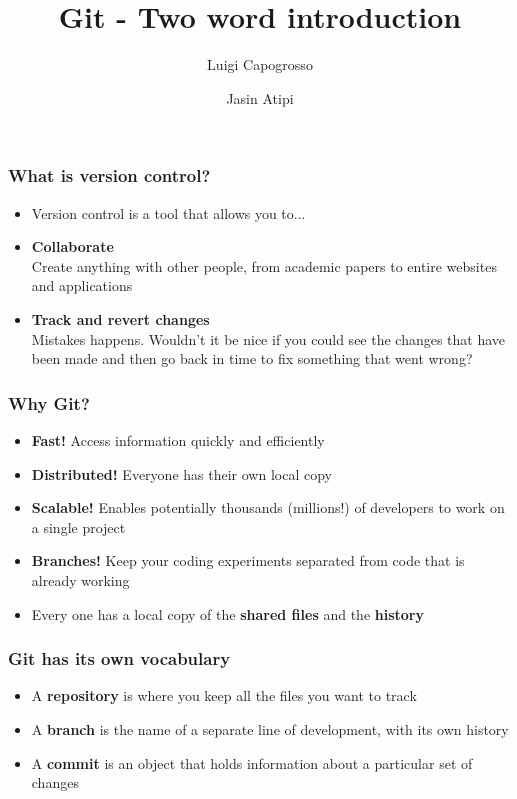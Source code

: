 \documentclass{beamer}
\title{Git - Two word introduction}
\author{Luigi Capogrosso \and Jasin Atipi}
\begin{document}
\begin{frame}
\maketitle
\end{frame}

\begin{frame}
\frametitle{What is version control?}
\begin{itemize}
\item <1-> Version control is a tool that allows you to...
\item <2-> \textbf{Collaborate} \\ 
Create anything with other people, from academic papers to entire websites and applications
\item <3-> \textbf{Track and revert changes} \\ 
Mistakes happens. Wouldn't it be nice if you could see the changes that have been made and then go back in time to fix something that went wrong?
\end{itemize}
\end{frame}

\begin{frame}
\frametitle{Why Git?}
\begin{itemize}
\item<1-> \textbf{Fast!} Access information quickly and efficiently
\item<2-> \textbf{Distributed!} Everyone has their own local copy
\item<3-> \textbf{Scalable!} Enables potentially thousands (millions!) of developers to work on a single project
\item<4-> \textbf{Branches!} Keep your coding experiments separated from code that is already working
\item<5-> Every one has a local copy of the \textbf{shared files} and the \textbf{history}
\end{itemize}
\end{frame}

\begin{frame}
\frametitle{Git has its own vocabulary}
\begin{itemize}
\item <1-> A \textbf{repository} is where you keep all the files you want to track
\item <2-> A \textbf{branch} is the name of a separate line of development, with its own history
\item <3-> A \textbf{commit} is an object that holds information about a particular set of changes
\end{itemize}
\end{frame}
\end{document}
